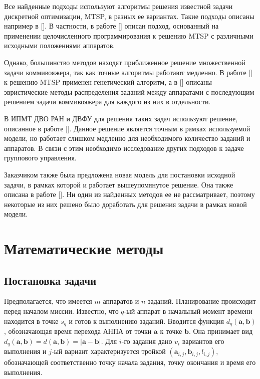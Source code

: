 \documentclass[a4paper,14pt,russian]{article}
\begin{document}
Все найденные подходы используют алгоритмы решения известной задачи дискретной оптимизации, MTSP, в разных ее вариантах. Такие подходы описаны например в []. В частности, в работе [] описан подход, основанный на применении целочисленного программирования к решению MTSP с различными исходными положениями аппаратов.

Однако, большинство методов находят приближенное решение множественной задачи коммивояжера, так как точные алгоритмы работают медленно. В работе [] к решению MTSP применен генетический алгоритм, а в [] описаны эвристические методы распределения заданий между аппаратами с последующим решением задачи коммивояжера для каждого из них в отдельности.


В ИПМТ ДВО РАН и ДВФУ для решения таких задач используют решение, описанное в работе []. Данное решение является точным в рамках используемой модели, но работает слишком медленно для необходимого количество заданий и аппаратов. В связи с этим необходимо исследование других подходов к задаче группового управления.

Заказчиком также была предложена новая модель для постановки исходной задачи, в рамках которой и работает вышеупомянутое решение. Она также описана в работе []. Ни один из найденных методов ее не рассматривает, поэтому некоторые из них решено было доработать для решения задачи в рамках новой модели.

\section{Математические методы}

\subsection{Постановка задачи}

Предполагается, что имеется $m$ аппаратов и $n$ заданий. Планирование происходит перед началом миссии. Известно, что $q$-ый аппарат в начальный момент времени находится в точке $s_q$ и готов к выполнению заданий. Вводится функция $d_q(\mathbf{a}, \mathbf{b})$, обозначающая время перехода АНПА от точки $\mathbf{a}$ к точке $\mathbf{b}$. Она принимает вид $d_q(\mathbf{a}, \mathbf{b}) = d(\mathbf{a}, \mathbf{b}) = |\mathbf{a} - \mathbf{b}|$. Для $i$-го задания дано $v_i$ вариантов его выполнения и $j$-ый вариант характеризуется тройкой $(\mathbf{a}_{i, j}, \mathbf{b}_{i,j}, l_{i,j})$, обозначающей соответственно точку начала задания, точку окончания и время его выполнения.
\end{document}
